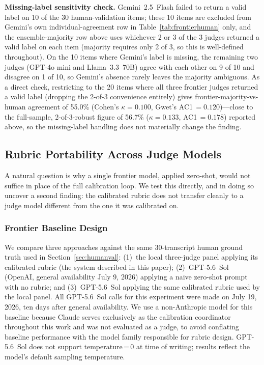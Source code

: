 \documentclass[11pt]{article}
\begin{document}
\textbf{Missing-label sensitivity check.} Gemini~2.5~Flash failed to
return a valid label on 10 of the 30 human-validation items; these 10
items are excluded from Gemini's own individual-agreement row in
Table~\ref{tab:frontierhuman} only, and the ensemble-majority row above
uses whichever 2 or 3 of the 3 judges returned a valid label on each
item (majority requires only 2 of 3, so this is well-defined throughout).
On the 10 items where Gemini's label is missing, the remaining two judges
(GPT-4o mini and Llama~3.3~70B) agree with each other on 9 of 10 and
disagree on 1 of 10, so Gemini's absence rarely leaves the majority
ambiguous. As a direct check, restricting to the 20 items where all three
frontier judges returned a valid label (dropping the 2-of-3 convenience
entirely) gives frontier-majority-vs-human agreement of 55.0\% (Cohen's
$\kappa=0.100$, Gwet's AC1\,$=0.120$)---close to the full-sample,
2-of-3-robust figure of 56.7\% ($\kappa=0.133$, AC1\,$=0.178$) reported
above, so the missing-label handling does not materially change the
finding.

\subsection{Rubric Portability Across Judge Models}
\label{sec:portability}

A natural question is why a single frontier model, applied zero-shot,
would not suffice in place of the full calibration loop. We test this
directly, and in doing so uncover a second finding: the calibrated rubric
does not transfer cleanly to a judge model different from the one it was
calibrated on.

\subsubsection{Frontier Baseline Design}

We compare three approaches against the same 30-transcript human ground
truth used in Section~\ref{sec:humanval}: (1)~the local three-judge panel
applying its calibrated rubric (the system described in this paper);
(2)~GPT-5.6~Sol~\cite{openaiGPT56Sol} (OpenAI, general availability July 9, 2026) applying a
naive zero-shot prompt with no rubric; and (3)~GPT-5.6~Sol applying the
same calibrated rubric used by the local panel. All GPT-5.6~Sol calls for
this experiment were made on July 19, 2026, ten days after general
availability. We use a non-Anthropic model for this
baseline because Claude serves exclusively as the calibration coordinator
throughout this work and was not evaluated as a judge, to avoid conflating
baseline performance with the model family responsible for rubric design.
GPT-5.6~Sol does not support temperature\,=\,0 at time of writing; results
reflect the model's default sampling temperature.
\end{document}
